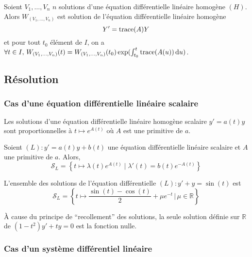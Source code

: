 
	\begin{proposition}
		Soient $V_1, \dots, V_n$ $n$ solutions d'une équation différentielle linéaire homogène $(H)$. Alors $W_{(V_1, \dots, V_n)}$ est solution de l'équation différentielle linéaire homogène
		\[ Y' = \operatorname{trace}(A) Y \]
		et pour tout $t_0$ élément de $I$, on a $\forall t \in I, \, W_{(V_1, \dots, V_n)}(t) = W_{(V_1, \dots, V_n)}(t_0) \exp(\int_{t_0}^t \operatorname{trace}(A(u)) \, \mathrm{d}u)$.
	\end{proposition}

	\subsection{Résolution}

	\subsubsection{Cas d'une équation différentielle linéaire scalaire}


	\begin{proposition}
		Les solutions d'une équation différentielle linéaire homogène scalaire $y' = a(t) y$ sont proportionnelles à $t \mapsto e^{A(t)}$ où $A$ est une primitive de $a$.
	\end{proposition}

	\begin{corollary}
		Soient $(L) : y' = a(t) y + b(t)$ une équation différentielle linéaire scalaire et $A$ une primitive de $a$. Alors,
		\[ \mathcal{S}_L = \left\{t \mapsto \lambda(t) e^{A(t)} \mid \lambda'(t) = b(t)e^{-A(t)}\right\} \]
	\end{corollary}

	\begin{example}
		L'ensemble des solutions de l'équation différentielle $(L) : y' + y = \sin(t)$ est
		\[ \mathcal{S}_L = \left \{ t \mapsto \frac{\sin(t) - \cos(t)}{2} + \mu e^{-t} \, \big\lvert \, \mu \in \mathbb{R} \right \} \]
	\end{example}

	\begin{example}
		À cause du principe de ``recollement'' des solutions, la seule solution définie sur $\mathbb{R}$ de $(1-t^2)y' + ty = 0$ est la fonction nulle.
	\end{example}

	\subsubsection{Cas d'un système différentiel linéaire}


